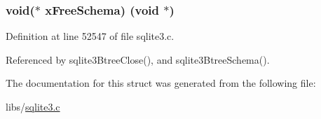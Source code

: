 \subsubsection[{x\+Free\+Schema}]{\setlength{\rightskip}{0pt plus 5cm}void($\ast$ x\+Free\+Schema) (void $\ast$)}\label{struct_bt_shared_abd937f71f6aed2873899ffb6ed52e459}


Definition at line 52547 of file sqlite3.\+c.



Referenced by sqlite3\+Btree\+Close(), and sqlite3\+Btree\+Schema().



The documentation for this struct was generated from the following file\+:\begin{DoxyCompactItemize}
\item 
libs/\hyperlink{sqlite3_8c}{sqlite3.\+c}\end{DoxyCompactItemize}
